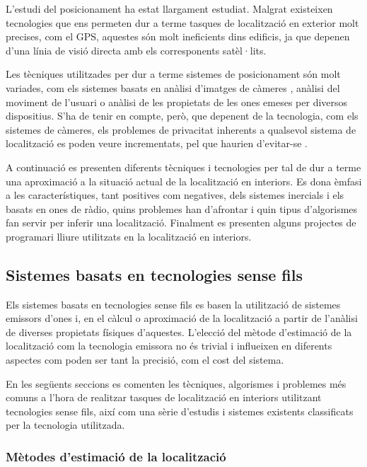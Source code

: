 
L’estudi del posicionament ha estat llargament estudiat. Malgrat existeixen tecnologies que ens permeten dur a terme tasques de localització en exterior molt precises, com el GPS, aquestes són molt ineficients dins edificis, ja que depenen d’una línia de visió directa amb els corresponents satèl·lits.

Les tècniques utilitzades per dur a terme sistemes de posicionament són molt variades, com els  sistemes basats en anàlisi d’imatges de càmeres \cite{martinez} \cite{mulloni}, anàlisi del moviment de l’usuari o anàlisi de les propietats de les ones emeses per diversos dispositius. S’ha de tenir en compte, però, que depenent de la tecnologia, com els sistemes de càmeres, els problemes de privacitat inherents a qualsevol sistema de localització es poden veure incrementats, pel que haurien d’evitar-se \cite{garcia}.

A continuació es presenten diferents tècniques i tecnologies per tal de dur a terme una aproximació a la situació actual de la localització en interiors. Es dona èmfasi a les característiques, tant positives com negatives, dels sistemes inercials i els basats en ones de ràdio, quins problemes han d’afrontar i quin tipus d’algorismes fan servir per inferir una localització. Finalment es presenten alguns projectes de programari lliure utilitzats en la localització en interiors.

\subsection{Sistemes basats en tecnologies sense fils}

Els sistemes basats en tecnologies sense fils es basen la utilització de sistemes emissors d'ones i, en el càlcul o aproximació de la localització a partir de l'anàlisi de diverses propietats físiques d'aquestes. L'elecció del mètode d'estimació de la localització com la tecnologia emissora no és trivial i influeixen en diferents aspectes com poden ser tant la precisió, com el cost del sistema.

En les següents seccions es comenten les tècniques, algorismes i problemes més comuns a l'hora de realitzar tasques de localització en interiors utilitzant tecnologies sense fils, així com una sèrie d'estudis i sistemes existents classificats per la tecnologia utilitzada. 

\subsubsection{Mètodes d’estimació de la localització}

